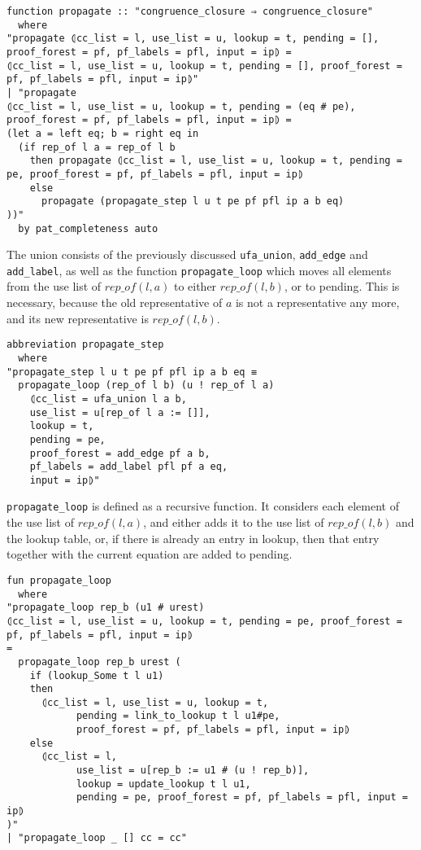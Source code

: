 \begin{lstlisting}
function propagate :: "congruence_closure ⇒ congruence_closure"
  where
"propagate ⦇cc_list = l, use_list = u, lookup = t, pending = [], proof_forest = pf, pf_labels = pfl, input = ip⦈ =
⦇cc_list = l, use_list = u, lookup = t, pending = [], proof_forest = pf, pf_labels = pfl, input = ip⦈"
| "propagate
⦇cc_list = l, use_list = u, lookup = t, pending = (eq # pe), proof_forest = pf, pf_labels = pfl, input = ip⦈ =
(let a = left eq; b = right eq in
  (if rep_of l a = rep_of l b
    then propagate ⦇cc_list = l, use_list = u, lookup = t, pending = pe, proof_forest = pf, pf_labels = pfl, input = ip⦈
    else
      propagate (propagate_step l u t pe pf pfl ip a b eq)
))"
  by pat_completeness auto
\end{lstlisting}

The union consists of the previously discussed \lstinline{ufa_union}, \lstinline{add_edge} and \lstinline{add_label}, as well as the function \lstinline|propagate_loop| which moves all elements from the use list of $rep\_of(l,a)$ to either $rep\_of(l, b)$, or to pending. This is necessary, because the old representative of $a$ is not a representative any more, and its new representative is  $rep\_of(l, b)$.

\begin{lstlisting}
abbreviation propagate_step
  where
"propagate_step l u t pe pf pfl ip a b eq ≡
  propagate_loop (rep_of l b) (u ! rep_of l a)
    ⦇cc_list = ufa_union l a b,
    use_list = u[rep_of l a := []],
    lookup = t,
    pending = pe,
    proof_forest = add_edge pf a b,
    pf_labels = add_label pfl pf a eq,
    input = ip⦈"
\end{lstlisting}

\lstinline|propagate_loop| is defined as a recursive function. It considers each element of the use list of $rep\_of(l, a)$, and either adds it to the use list of $rep\_of(l, b)$ and the lookup table, or, if there is already an entry in lookup, then that entry together with the current equation are added to pending.

\begin{lstlisting}
fun propagate_loop
  where
"propagate_loop rep_b (u1 # urest)
⦇cc_list = l, use_list = u, lookup = t, pending = pe, proof_forest = pf, pf_labels = pfl, input = ip⦈
=
  propagate_loop rep_b urest (
    if (lookup_Some t l u1)
    then
      ⦇cc_list = l, use_list = u, lookup = t,
            pending = link_to_lookup t l u1#pe,
            proof_forest = pf, pf_labels = pfl, input = ip⦈
    else
      ⦇cc_list = l,
            use_list = u[rep_b := u1 # (u ! rep_b)],
            lookup = update_lookup t l u1,
            pending = pe, proof_forest = pf, pf_labels = pfl, input = ip⦈
)"
| "propagate_loop _ [] cc = cc"
\end{lstlisting}

